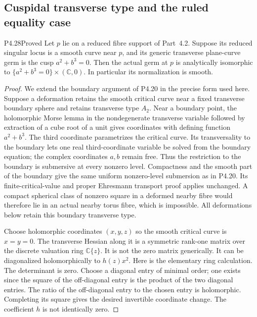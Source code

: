 \subsection{Cuspidal transverse type and the ruled equality case}

\begin{statement}{P4.28}{Proved}
Let $p$ lie on a reduced fibre support of Part~4.2.
Suppose its reduced singular locus is a smooth curve
near $p$, and its generic transverse plane-curve germ
is the cusp $a^2+b^3=0$. Then the actual germ at $p$
is analytically isomorphic to
$\{a^2+b^3=0\}\times(\mathbb C,0)$.
In particular its normalization is smooth.
\end{statement}
\begin{proof}
We extend the boundary argument of P4.20 in the
precise form used here. Suppose a deformation retains
the smooth critical curve near a fixed transverse
boundary sphere and retains transverse type $A_2$.
Near a boundary point, the holomorphic Morse lemma
in the nondegenerate transverse variable followed
by extraction of a cube root of a unit gives
coordinates with defining function $a^2+b^3$.
The third coordinate parametrizes the critical
curve. Its transversality to the boundary lets
one real third-coordinate variable be solved
from the boundary equation; the complex
coordinates $a,b$ remain free. Thus the
restriction to the boundary is submersive
at every nonzero level. Compactness and
the smooth part of the boundary give the
same uniform nonzero-level submersion as
in P4.20. Its finite-critical-value and
proper Ehresmann transport proof applies
unchanged. A compact spherical class of
nonzero square in a deformed nearby
fibre would therefore lie in an actual
nearby torus fibre, which is impossible.
All deformations below retain this
boundary transverse type.

Choose holomorphic coordinates $(x,y,z)$
so the smooth critical curve is $x=y=0$.
The transverse Hessian along it is a
symmetric rank-one matrix over the
discrete valuation ring $\mathbb C\{z\}$.
It is not the zero matrix generically.
It can be diagonalized holomorphically
to $h(z)x^2$. Here is the elementary
ring calculation. The determinant is
zero. Choose a diagonal entry of
minimal order; one exists since the
square of the off-diagonal entry is
the product of the two diagonal entries.
The ratio of the off-diagonal entry
to the chosen entry is holomorphic.
Completing its square gives the desired
invertible coordinate change. The
coefficient $h$ is not identically zero.


\end{proof}

